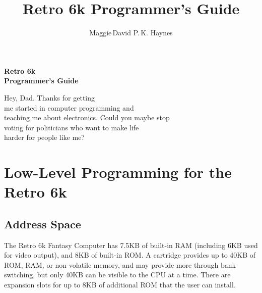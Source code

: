 \documentclass[12pt]{{memoir}}
\begin{document}
\title{Retro 6k Programmer's Guide}
\author{Maggie\,David P.\,K. Haynes}
\pagestyle{empty}
{\centering\sffamily\bfseries\Huge{}Retro 6k\\Programmer's Guide\par}
{\centering\sffamily\bfseries\large\theauthor\par}
\cleartoverso
{}

\begin{center}
\noindent{}Hey, Dad. Thanks for getting \\
me started in computer programming and \\
teaching me about electronics. Could you maybe stop \\
voting for politicians who want to make life \\
harder for people like me?\par
\end{center}

\cleartorecto
\tableofcontents
\cleartorecto
\pagestyle{headings}
\chapter{Low-Level Programming for the Retro 6k}
\section{Address Space}

The Retro 6k Fantasy Computer has 7.5KB of built-in RAM (including 6KB used for video output), and 8KB of built-in ROM. A cartridge provides up to 40KB of ROM, RAM, or non-volatile memory, and may provide more through bank switching, but only 40KB can be visible to the CPU at a time. There are expansion slots for up to 8KB of additional ROM that the user can install.
\end{document}
